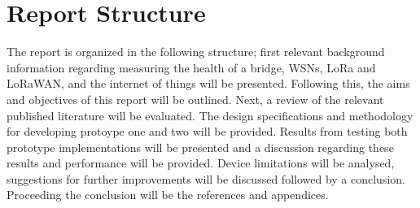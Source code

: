 \section{Report Structure}

The report is organized in the following structure; first relevant background information regarding measuring the health of a bridge, WSNs, LoRa and LoRaWAN, and the internet of things will be presented. Following this, the aims and objectives of this report will be outlined. Next, a review of the relevant published literature will be evaluated. The design specifications and methodology for developing protoype one and two will be provided. Results from testing both prototype implementations will be presented and a discussion regarding these results and performance will be provided. Device limitations will be analysed, suggestions for further improvements will be discussed followed by a conclusion. Proceeding the conclusion will be the references and appendices. 
